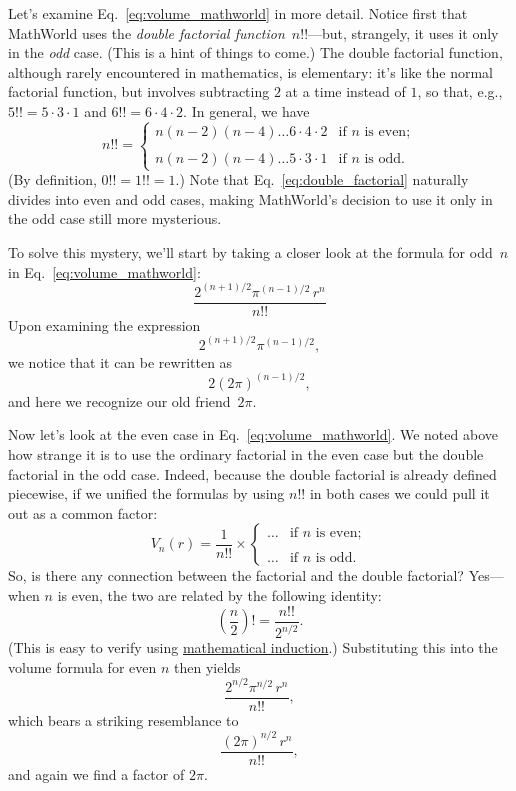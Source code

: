 Let's examine Eq.~\eqref{eq:volume_mathworld} in more detail. Notice first that MathWorld uses the \emph{double factorial function}~$n!!$---but, strangely, it uses it only in the \emph{odd} case. (This is a hint of things to come.) The double factorial function, although rarely encountered in mathematics, is elementary: it's like the normal factorial function, but involves subtracting $2$ at a time instead of $1$, so that, e.g., $5!! = 5 \cdot 3 \cdot 1$ and $6!! = 6 \cdot 4 \cdot 2$. In general, we have
\begin{equation}
\label{eq:double_factorial}
n!! = \begin{cases}
n(n-2)(n-4)\ldots6\cdot4\cdot2 & \text{if } n \text{ is even}; \\ \\
n(n-2)(n-4)\ldots5\cdot3\cdot1 & \text{if } n \text{ is odd}.
\end{cases}
\end{equation}
(By definition, $0!! = 1!! = 1$.) Note that Eq.~\eqref{eq:double_factorial} naturally divides into even and odd cases, making MathWorld's decision to use it only in the odd case still more mysterious.

To solve this mystery, we'll start by taking a closer look at the formula for odd~$n$ in Eq.~\eqref{eq:volume_mathworld}:
\[ \frac{2^{(n+1)/2}\pi^{(n-1)/2}\,r^n}{n!!} \]
Upon examining the expression
\[ 2^{(n+1)/2}\pi^{(n-1)/2}, \]
we notice that it can be rewritten as
\[ 2(2\pi)^{(n-1)/2}, \]
and here we recognize our old friend~$2\pi$.

Now let's look at the even case in Eq.~\eqref{eq:volume_mathworld}. We noted above how strange it is to use the ordinary factorial in the even case but the double factorial in the odd case. Indeed, because the double factorial is already defined piecewise, if we unified the formulas by using $n!!$ in both cases we could pull it out as a common factor:
\[
V_n(r) = \frac{1}{n!!}\times \begin{cases}
\ldots & \text{if } n \text{ is even}; \\ \\
 \ldots & \text{if } n \text{ is odd}.
 \end{cases}
\]
So, is there any connection between the factorial and the double factorial? Yes---when $n$ is even, the two are related by the following identity:
\[ \left(\frac{n}{2}\right)! = \frac{n!!}{2^{n/2}}. \]
(This is easy to verify using \href{https://en.wikipedia.org/wiki/Mathematical_induction}{mathematical induction}.) Substituting this into the volume formula for even $n$ then yields
\[ \frac{2^{n/2}\pi^{n/2}\,r^n}{n!!}, \]
which bears a striking resemblance to
\[ \frac{(2\pi)^{n/2}\,r^n}{n!!}, \]
and again we find a factor of $2\pi$.

